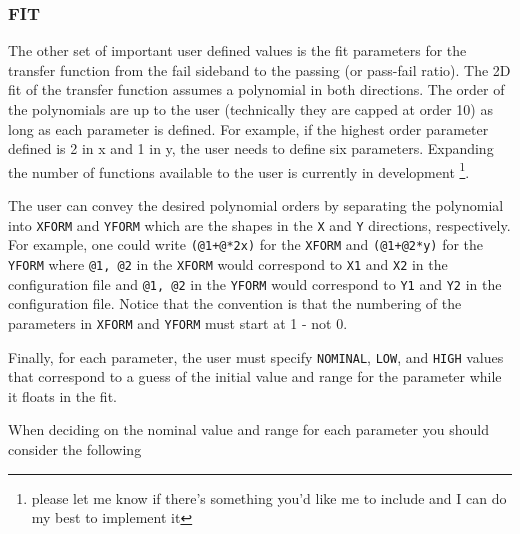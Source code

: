 \documentclass[letter]{article}
\begin{document}
        \subsubsection{FIT}
            The other set of important user defined values is the fit parameters for the transfer function from the fail sideband to the passing (or pass-fail ratio). The 2D fit of the transfer function assumes a polynomial in both directions. The order of the polynomials are up to the user (technically they are capped at order 10) as long as each parameter is defined. For example, if the highest order parameter defined is 2 in x and 1 in y, the user needs to define six parameters. Expanding the number of functions available to the user is currently in development \footnote{please let me know if there's something you'd like me to include and I can do my best to implement it}. 

            The user can convey the desired polynomial orders by separating the polynomial into \verb"XFORM" and \verb"YFORM" which are the shapes in the \verb"X" and \verb"Y" directions, respectively. For example, one could write \verb"(@1+@*2x)" for the \verb"XFORM" and \verb"(@1+@2*y)" for the \verb"YFORM" where \verb"@1, @2" in the \verb"XFORM" would correspond to \verb"X1" and \verb"X2" in the configuration file and \verb"@1, @2" in the \verb"YFORM" would correspond to \verb"Y1" and \verb"Y2" in the configuration file. Notice that the convention is that the numbering of the parameters in \verb"XFORM" and \verb"YFORM" must start at 1 - not 0.

            Finally, for each parameter, the user must specify \verb"NOMINAL", \verb"LOW", and \verb"HIGH" values that correspond to a guess of the initial value and range for the parameter while it floats in the fit. 

            When deciding on the nominal value and range for each parameter you should consider the following
            \begin{itemize}
            
            \end{itemize}
\end{document}
